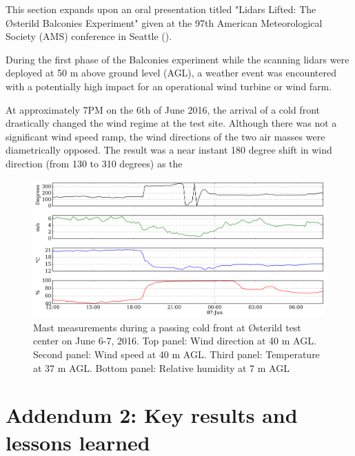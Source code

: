 This section expands upon an oral presentation titled "Lidars Lifted: The {\O}sterild Balconies Experiment" given at the 97th American Meteorological Society (AMS) conference in Seattle (\cite{simon_lidars_lifted_2017}).

During the first phase of the Balconies experiment while the scanning lidars were deployed at 50 m above ground level (AGL),
a weather event was encountered with a potentially high impact for an operational wind turbine or wind farm.

At approximately 7PM on the 6th of June 2016, the arrival of a cold front drastically changed the wind regime at the test site. Although there was not a significant wind speed ramp, the wind directions of the two air masses were diametrically opposed. The result was a near instant 180 degree shift in wind direction (from 130 to 310 degrees) as the 


\begin{figure}[htbp]
    \centering
        \includegraphics[width=1.0\textwidth]{graphics/intro/balcony-addendum/balcony-front-mast.png}
    \caption{Mast measurements during a passing cold front at {\O}sterild test center on June 6-7, 2016.
    Top panel: Wind direction at 40 m AGL. Second panel: Wind speed at 40 m AGL. Third panel: Temperature at 37 m AGL. Bottom panel: Relative humidity at 7 m AGL}
    \label{fig:balcony-front-mast}
\end{figure}


















\clearpage
\section{Addendum 2: Key results and lessons learned}
\label{sec:balcony_addendum2}

